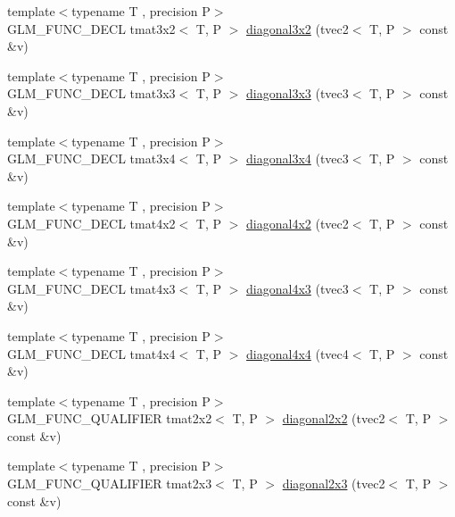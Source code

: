 \begin{DoxyCompactItemize}
\item 
{\footnotesize template$<$typename T , precision P$>$ }\\G\+L\+M\+\_\+\+F\+U\+N\+C\+\_\+\+D\+E\+C\+L tmat3x2$<$ T, P $>$ \hyperlink{group__gtx__matrix__operation_ga586e1ced91fd8a7c414186a200f13532}{diagonal3x2} (tvec2$<$ T, P $>$ const \&v)
\item 
{\footnotesize template$<$typename T , precision P$>$ }\\G\+L\+M\+\_\+\+F\+U\+N\+C\+\_\+\+D\+E\+C\+L tmat3x3$<$ T, P $>$ \hyperlink{group__gtx__matrix__operation_ga8e817dba22f2305cdebae07bbbe0360c}{diagonal3x3} (tvec3$<$ T, P $>$ const \&v)
\item 
{\footnotesize template$<$typename T , precision P$>$ }\\G\+L\+M\+\_\+\+F\+U\+N\+C\+\_\+\+D\+E\+C\+L tmat3x4$<$ T, P $>$ \hyperlink{group__gtx__matrix__operation_gae3f85af86c18c80f2acbe3223feb8e81}{diagonal3x4} (tvec3$<$ T, P $>$ const \&v)
\item 
{\footnotesize template$<$typename T , precision P$>$ }\\G\+L\+M\+\_\+\+F\+U\+N\+C\+\_\+\+D\+E\+C\+L tmat4x2$<$ T, P $>$ \hyperlink{group__gtx__matrix__operation_ga70cc5632aa9f41e7cf0b81fee6f2bfe6}{diagonal4x2} (tvec2$<$ T, P $>$ const \&v)
\item 
{\footnotesize template$<$typename T , precision P$>$ }\\G\+L\+M\+\_\+\+F\+U\+N\+C\+\_\+\+D\+E\+C\+L tmat4x3$<$ T, P $>$ \hyperlink{group__gtx__matrix__operation_ga4242ea5681f81539e0c5b54fadcd9ddf}{diagonal4x3} (tvec3$<$ T, P $>$ const \&v)
\item 
{\footnotesize template$<$typename T , precision P$>$ }\\G\+L\+M\+\_\+\+F\+U\+N\+C\+\_\+\+D\+E\+C\+L tmat4x4$<$ T, P $>$ \hyperlink{group__gtx__matrix__operation_gade576e044d8e52f343166f665589d782}{diagonal4x4} (tvec4$<$ T, P $>$ const \&v)
\item 
{\footnotesize template$<$typename T , precision P$>$ }\\G\+L\+M\+\_\+\+F\+U\+N\+C\+\_\+\+Q\+U\+A\+L\+I\+F\+I\+E\+R tmat2x2$<$ T, P $>$ \hyperlink{group__gtx__matrix__operation_ga01dc503262dba9c457113d131fc8c024}{diagonal2x2} (tvec2$<$ T, P $>$ const \&v)
\item 
{\footnotesize template$<$typename T , precision P$>$ }\\G\+L\+M\+\_\+\+F\+U\+N\+C\+\_\+\+Q\+U\+A\+L\+I\+F\+I\+E\+R tmat2x3$<$ T, P $>$ \hyperlink{group__gtx__matrix__operation_ga763817f07d6a94b722a48adfa87a35db}{diagonal2x3} (tvec2$<$ T, P $>$ const \&v)

\end{DoxyCompactItemize}
